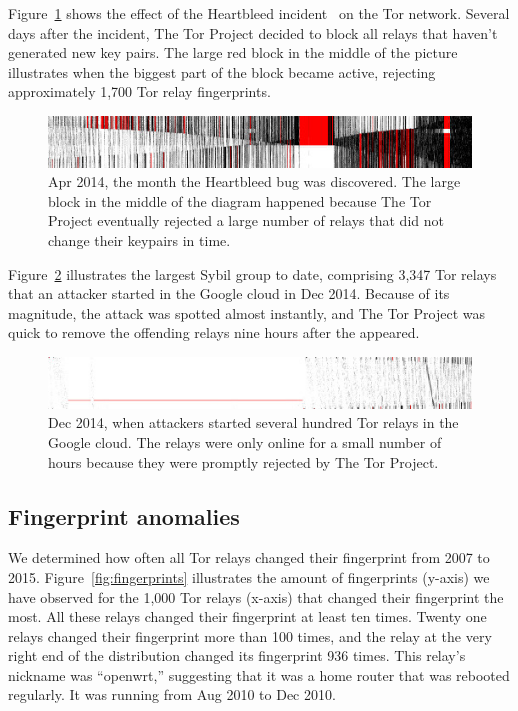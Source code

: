 Figure~\ref{fig:2014-04-heartbleed} shows the effect of the Heartbleed
incident~\cite{Durumeric2014a} on the Tor network.  Several days after the
incident, The Tor Project decided to block all relays that haven't generated new
key pairs.  The large red block in the middle of the picture illustrates when
the biggest part of the block became active, rejecting approximately 1,700 Tor
relay fingerprints.

\begin{figure}[t]
	\centering
	\includegraphics[width=\linewidth]{diagrams/heartbleed-uptimes.jpg}
	\caption{Apr 2014, the month the Heartbleed bug was discovered.
		The large block in the middle of the diagram happened because The
		Tor Project eventually rejected a large number of relays that did not
		change their keypairs in time.}
		\label{fig:2014-04-heartbleed}
\end{figure}

Figure~\ref{fig:2014-12-lizard} illustrates the largest Sybil group to date,
comprising 3,347 Tor relays that an attacker started in the Google cloud in
Dec 2014.  Because of its magnitude, the attack was spotted almost
instantly, and The Tor Project was quick to remove the offending relays nine
hours after the appeared.

\begin{figure}[t]
	\centering
	\includegraphics[width=\linewidth]{diagrams/lizard-uptimes.jpg}
	\caption{Dec 2014, when attackers started several hundred Tor
	relays in the Google cloud.  The relays were only online for a small number
	of hours because they were promptly rejected by The Tor Project.}
	\label{fig:2014-12-lizard}
\end{figure}

\subsection{Fingerprint anomalies}
\label{sec:fingerprint-anomalies}
We determined how often all Tor relays changed their fingerprint from 2007 to
2015.  Figure~\ref{fig:fingerprints} illustrates the amount of fingerprints
(y-axis) we have observed for the 1,000 Tor relays (x-axis) that changed their
fingerprint the most.  All these relays changed their fingerprint at least ten
times.  Twenty one relays changed their fingerprint more than 100 times, and the
relay at the very right end of the distribution changed its fingerprint 936
times.  This relay's nickname was ``openwrt,'' suggesting that it was a home
router that was rebooted regularly.  It was running from Aug 2010 to Dec 2010.

